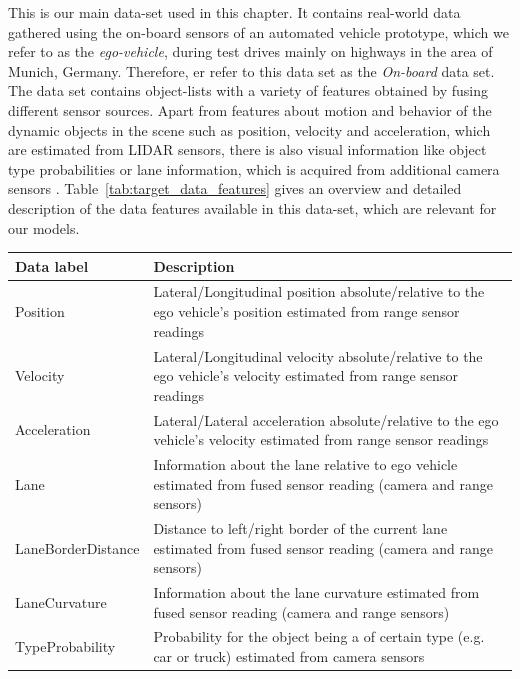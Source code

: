 This is our main data-set used in this chapter.
It contains real-world data gathered using the on-board sensors of an automated vehicle prototype, which we refer to as the \emph{ego-vehicle}, during test drives mainly on highways in the area of Munich, Germany.
Therefore, er refer to this data set as the \emph{On-board} data set.
The data set contains object-lists with a variety of features obtained by fusing different sensor sources.
Apart from features about motion and behavior of the dynamic objects in the scene such as position, velocity and acceleration, which are estimated from \ac{LIDAR} sensors, there is also visual information like object type probabilities or lane information, which is acquired from additional camera sensors \parencite[see][for further information on the sensor setup]{Aeberhard2015}.
Table~\ref{tab:target_data_features} gives an overview and detailed description of the data features available in this data-set, which are relevant for our models.
\begin{center}
	\begin{tabular}{|l | p{12cm}|}
		\hline
		\textbf{Data label} & \textbf{Description}\\ \hline
		Position & Lateral/Longitudinal position absolute/relative to the ego vehicle's position estimated from range sensor readings \\ \hline
		Velocity& Lateral/Longitudinal velocity absolute/relative to the ego vehicle's velocity estimated from range sensor readings \\ \hline
		Acceleration & Lateral/Lateral acceleration absolute/relative to the ego vehicle's velocity estimated from range sensor readings \\ \hline
		Lane & Information about the lane relative to ego vehicle estimated from fused sensor reading (camera and range sensors) \\ \hline
		LaneBorderDistance & Distance to left/right border of the current lane estimated from fused sensor reading (camera and range sensors) \\ \hline
		LaneCurvature & Information about the lane curvature estimated from fused sensor reading (camera and range sensors) \\ \hline
		TypeProbability & Probability for the object being a of certain type (e.g. car or truck) estimated from camera sensors \\ \hline
	\end{tabular}
	\label{tab:target_data_features}
\end{center}

